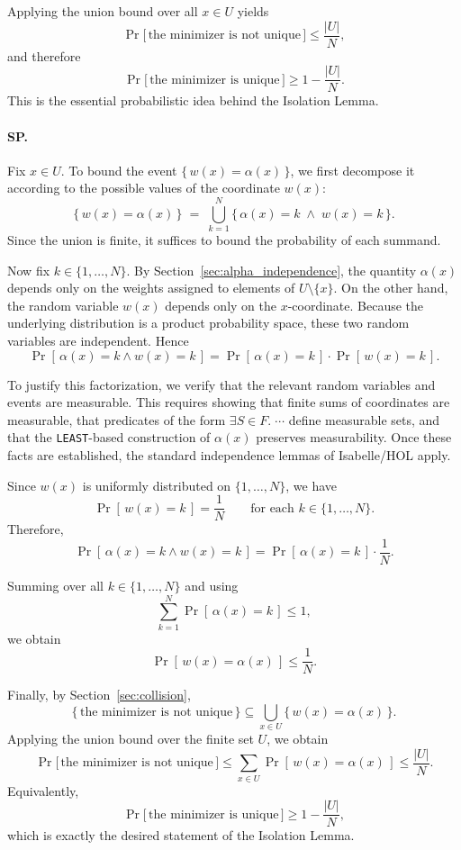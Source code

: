 Applying the union bound over all $x \in U$ yields
\[
\Pr\bigl[\, \text{the minimizer is not unique} \,\bigr]
\le \frac{|U|}{N},
\]
and therefore
\[
\Pr\bigl[\, \text{the minimizer is unique} \,\bigr]
\ge 1 - \frac{|U|}{N}.
\]
This is the essential probabilistic idea behind the Isolation Lemma.

\paragraph{SP.}

Fix $x \in U$.
To bound the event $\{\, w(x) = \alpha(x) \,\}$, we first decompose it according to the possible values of the coordinate $w(x)$:
\[
\{\, w(x) = \alpha(x) \,\}
\;=\;
\bigcup_{k=1}^{N} \{\, \alpha(x) = k \;\wedge\; w(x) = k \,\}.
\]
Since the union is finite, it suffices to bound the probability of each summand.

Now fix $k \in \{1,\dots,N\}$.
By Section~\ref{sec:alpha_independence}, the quantity $\alpha(x)$ depends only on the weights assigned to elements of $U \setminus \{x\}$.
On the other hand, the random variable $w(x)$ depends only on the $x$-coordinate.
Because the underlying distribution is a product probability space, these two random variables are independent.
Hence
\[
\Pr[\, \alpha(x) = k \wedge w(x) = k \,]
=
\Pr[\, \alpha(x) = k \,] \cdot \Pr[\, w(x) = k \,].
\]

To justify this factorization, we verify that the relevant random variables and events are measurable.
This requires showing that finite sums of coordinates are measurable, that predicates of the form
$\exists S \in F.\; \cdots$ define measurable sets, and that the \texttt{LEAST}-based construction of $\alpha(x)$ preserves measurability.
Once these facts are established, the standard independence lemmas of Isabelle/HOL apply.

Since $w(x)$ is uniformly distributed on $\{1,\dots,N\}$, we have
\[
\Pr[\, w(x) = k \,] = \frac{1}{N}
\qquad\text{for each } k \in \{1,\dots,N\}.
\]
Therefore,
\[
\Pr[\, \alpha(x) = k \wedge w(x) = k \,]
=
\Pr[\, \alpha(x) = k \,] \cdot \frac{1}{N}.
\]

Summing over all $k \in \{1,\dots,N\}$ and using
\[
\sum_{k=1}^N \Pr[\, \alpha(x)=k \,] \le 1,
\]
we obtain
\[
\Pr[\, w(x) = \alpha(x) \,]
\le \frac{1}{N}.
\]

Finally, by Section~\ref{sec:collision},
\[
\{\, \text{the minimizer is not unique} \,\}
\subseteq
\bigcup_{x \in U} \{\, w(x) = \alpha(x) \,\}.
\]
Applying the union bound over the finite set $U$, we obtain
\[
\Pr\bigl[\, \text{the minimizer is not unique} \,\bigr]
\le \sum_{x \in U} \Pr[\, w(x) = \alpha(x) \,]
\le \frac{|U|}{N}.
\]
Equivalently,
\[
\Pr\bigl[\, \text{the minimizer is unique} \,\bigr]
\ge 1 - \frac{|U|}{N},
\]
which is exactly the desired statement of the Isolation Lemma.
